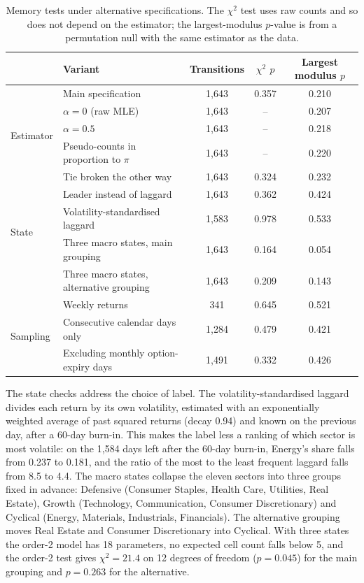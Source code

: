 \documentclass[11pt]{article}
\begin{document}
\begin{table}[htbp]\centering
\caption{Memory tests under alternative specifications. The $\chi^2$ test uses raw counts and so does not depend on the estimator; the largest-modulus $p$-value is from a permutation null with the same estimator as the data.}
\label{tab:spec}
\small
\begin{tabular}{llccc}
\toprule
 & Variant & Transitions & $\chi^2$ $p$ & Largest modulus $p$ \\
\midrule
 & Main specification & 1{,}643 & 0.357 & 0.210 \\
\midrule
\multirow{3}{*}{Estimator} & $\alpha = 0$ (raw MLE) & 1{,}643 & -- & 0.207 \\
 & $\alpha = 0.5$ & 1{,}643 & -- & 0.218 \\
 & Pseudo-counts in proportion to $\pi$ & 1{,}643 & -- & 0.220 \\
\midrule
\multirow{5}{*}{State} & Tie broken the other way & 1{,}643 & 0.324 & 0.232 \\
 & Leader instead of laggard & 1{,}643 & 0.362 & 0.424 \\
 & Volatility-standardised laggard & 1{,}583 & 0.978 & 0.533 \\
 & Three macro states, main grouping & 1{,}643 & 0.164 & 0.054 \\
 & Three macro states, alternative grouping & 1{,}643 & 0.209 & 0.143 \\
\midrule
\multirow{3}{*}{Sampling} & Weekly returns & 341 & 0.645 & 0.521 \\
 & Consecutive calendar days only & 1{,}284 & 0.479 & 0.421 \\
 & Excluding monthly option-expiry days & 1{,}491 & 0.332 & 0.426 \\
\bottomrule
\end{tabular}
\end{table}

The state checks address the choice of label. The volatility-standardised laggard divides each return by its own volatility, estimated with an exponentially weighted average of past squared returns (decay 0.94) and known on the previous day, after a 60-day burn-in. This makes the label less a ranking of which sector is most volatile: on the 1{,}584 days left after the 60-day burn-in, Energy's share falls from 0.237 to 0.181, and the ratio of the most to the least frequent laggard falls from 8.5 to 4.4. The macro states collapse the eleven sectors into three groups fixed in advance: Defensive (Consumer Staples, Health Care, Utilities, Real Estate), Growth (Technology, Communication, Consumer Discretionary) and Cyclical (Energy, Materials, Industrials, Financials). The alternative grouping moves Real Estate and Consumer Discretionary into Cyclical. With three states the order-2 model has 18 parameters, no expected cell count falls below 5, and the order-2 test gives $\chi^2 = 21.4$ on 12 degrees of freedom ($p = 0.045$) for the main grouping and $p = 0.263$ for the alternative.
\end{document}
